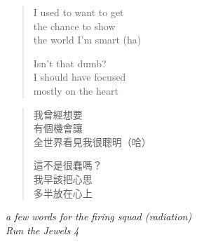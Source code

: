 \clearpage\thispagestyle{empty}\vspace*{\fill}

\begin{verse}
I used to want to get \\
the chance to show \\
the world I'm smart (ha)

Isn't that dumb? \\
I should have focused \\
mostly on the heart
\end{verse}
\begin{verse}\small
我曾經想要 \\
有個機會讓 \\
全世界看見我很聰明（哈）

這不是很蠢嗎？ \\
我早該把心思 \\
多半放在心上
\end{verse}
\begin{flushright}\small\itshape
a few words for the firing squad (radiation) \\
Run the Jewels 4
\end{flushright}

\vspace*{\fill}\clearpage
